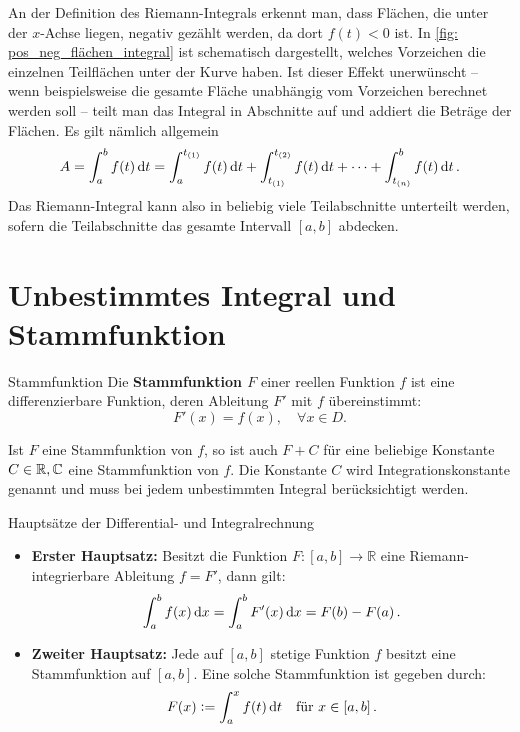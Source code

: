 An der Definition des Riemann-Integrals erkennt man, dass Flächen, die unter der $x$-Achse liegen, negativ gezählt werden, da dort $f(t) < 0$ ist. In \cref{fig: pos_neg_flächen_integral} ist schematisch dargestellt, welches Vorzeichen die einzelnen Teilflächen unter der Kurve haben. Ist dieser Effekt unerwünscht -- wenn beispielsweise die gesamte Fläche unabhängig vom Vorzeichen berechnet werden soll -- teilt man das Integral in Abschnitte auf und addiert die Beträge der Flächen. Es gilt nämlich allgemein
\begin{equation}
    A = \int_{a}^{b}f(t)\,\mathrm{d} t = \int_{a}^{t_{(1)}}f(t)\,\mathrm{d} t + \int_{t_{(1)}}^{t_{(2)}}f(t)\,\mathrm{d} t + \dots + \int_{t_{(n)}}^{b}f(t)\,\mathrm{d} t \,.
\end{equation}
Das Riemann-Integral kann also in beliebig viele Teilabschnitte unterteilt werden, sofern die Teilabschnitte das gesamte Intervall $[a,b]$ abdecken.

\section{Unbestimmtes Integral und Stammfunktion}\label{sec: unbestimmtesIntegral_Stammfunktion}
\begin{rememberbox}[]{Stammfunktion}
    Die \textbf{Stammfunktion $F$} einer reellen Funktion $f$ ist eine differenzierbare Funktion, deren Ableitung $F'$ mit $f$ übereinstimmt: 
    \begin{equation}
        F'(x) = f(x), \quad \forall x \in D.
    \end{equation}
\end{rememberbox}
Ist $F$ eine Stammfunktion von $f$, so ist auch $F + C$ für eine beliebige Konstante $C\in\mathbb{R},\mathbb{C}$ eine Stammfunktion von $f$. Die Konstante $C$ wird Integrationskonstante genannt und muss bei jedem unbestimmten Integral berücksichtigt werden.

\begin{importantbox}{Hauptsätze der Differential- und Integralrechnung}
\begin{itemize}
    \item \textbf{Erster Hauptsatz:} Besitzt die Funktion $F:[a,b]\rightarrow\mathbb{R}$ eine Riemann-integrierbare Ableitung $f=F'$, dann gilt:
    \begin{equation}
        \int_{a}^{b}f(x)\,\mathrm{d} x = \int_{a}^{b}F'(x)\,\mathrm{d} x = F(b)-F(a) \,.
    \end{equation}
    \item \textbf{Zweiter Hauptsatz:} Jede auf $[a, b]$ stetige Funktion $f$ besitzt eine Stammfunktion auf $[a, b]$. Eine solche Stammfunktion ist gegeben durch:
    \begin{equation}
        F(x) \vcentcolon= \int_{a}^{x}f(t)\,\mathrm{d} t \quad \text{für } x \in [a,b] \,.
    \end{equation}
\end{itemize}
\end{importantbox}


